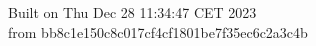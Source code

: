{\noindent Built on Thu Dec 28 11:34:47 CET 2023} \\ 
 {\noindent from bb8c1e150c8c017cf4cf1801be7f35ec6c2a3c4b}
